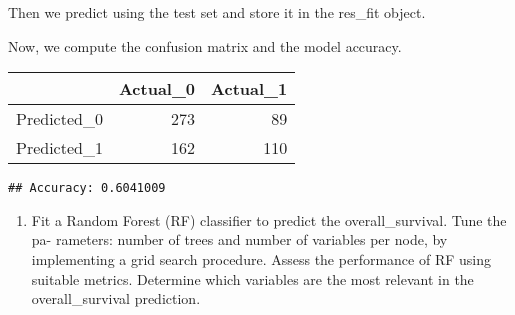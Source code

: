\documentclass[
]{article}
\newenvironment{Shaded}{\begin{snugshade}}{\end{snugshade}}
\newcommand{\CommentTok}[1]{\textcolor[rgb]{0.56,0.35,0.01}{\textit{#1}}}
\newcommand{\DataTypeTok}[1]{\textcolor[rgb]{0.13,0.29,0.53}{#1}}
\newcommand{\DecValTok}[1]{\textcolor[rgb]{0.00,0.00,0.81}{#1}}
\newcommand{\KeywordTok}[1]{\textcolor[rgb]{0.13,0.29,0.53}{\textbf{#1}}}
\newcommand{\NormalTok}[1]{#1}
\newcommand{\OperatorTok}[1]{\textcolor[rgb]{0.81,0.36,0.00}{\textbf{#1}}}
\newcommand{\OtherTok}[1]{\textcolor[rgb]{0.56,0.35,0.01}{#1}}
\providecommand{\tightlist}{%
  \setlength{\itemsep}{0pt}\setlength{\parskip}{0pt}}
\begin{document}
Then we predict using the test set and store it in the res\_fit object.

Now, we compute the confusion matrix and the model accuracy.

\begin{Shaded}
\end{Shaded}

\begin{longtable}[]{@{}lrr@{}}
\toprule
& Actual\_0 & Actual\_1\tabularnewline
\midrule
\endhead
Predicted\_0 & 273 & 89\tabularnewline
Predicted\_1 & 162 & 110\tabularnewline
\bottomrule
\end{longtable}

\begin{Shaded}
\end{Shaded}

\begin{verbatim}
## Accuracy: 0.6041009
\end{verbatim}

\begin{enumerate}
\def\labelenumi{\arabic{enumi}.}
\setcounter{enumi}{3}
\tightlist
\item
  Fit a Random Forest (RF) classifier to predict the overall\_survival.
  Tune the pa- rameters: number of trees and number of variables per
  node, by implementing a grid search procedure. Assess the performance
  of RF using suitable metrics. Determine which variables are the most
  relevant in the overall\_survival prediction.
\end{enumerate}

\begin{Shaded}
\end{Shaded}
\end{document}
